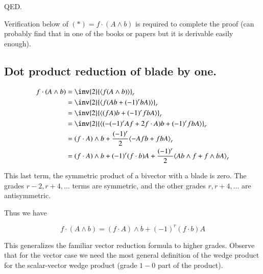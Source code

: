 \documentclass{article}      %
\newcommand{\gpgrade}[2] {{\left\langle{{#1}}\right\rangle}_{#2}}
\begin{document}
QED.

Verification below of $(*) = f \cdot (A \wedge b)$ is required to complete the proof (can probably find that in one of the books or papers but it is derivable
easily enough).

\subsection{ Dot product reduction of blade by one. }

\begin{align*}
f \cdot (A \wedge b)
&= \inv{2} \gpgrade{f (A \wedge b)}{r} \\
&= \inv{2} \gpgrade{f (A b + (-1)^r b A)}{r} \\
&= \inv{2} \gpgrade{(f A) b + (-1)^r f b A}{r} \\
&= \inv{2} \gpgrade{(-(-1)^r A f + 2 f \cdot A) b + (-1)^r f b A}{r} \\
&= (f \cdot A) \wedge b + \frac{(-1)^r}{2} \gpgrade{-A f b + f b A}{r} \\
&= (f \cdot A) \wedge b + (-1)^r (f \cdot b) A
+ \frac{(-1)^r}{2} \gpgrade{A b \wedge f + f \wedge b A}{r} \\
\end{align*}

This last term, the symmetric product of a bivector with a blade is zero.
The grades $r-2, r+4, \ldots$ terms are symmetric, and the other grades
$r, r+4, \ldots$ are antisymmetric.

Thus we have

\begin{equation}
f \cdot (A \wedge b)
= (f \cdot A) \wedge b + (-1)^r (f \cdot b) A
\end{equation}

This generalizes the familiar vector reduction formula to higher grades.
Observe that for the vector case we need the most general definition
of the wedge product for the scalar-vector wedge product (grade $1-0$ part of the product).
\end{document}
